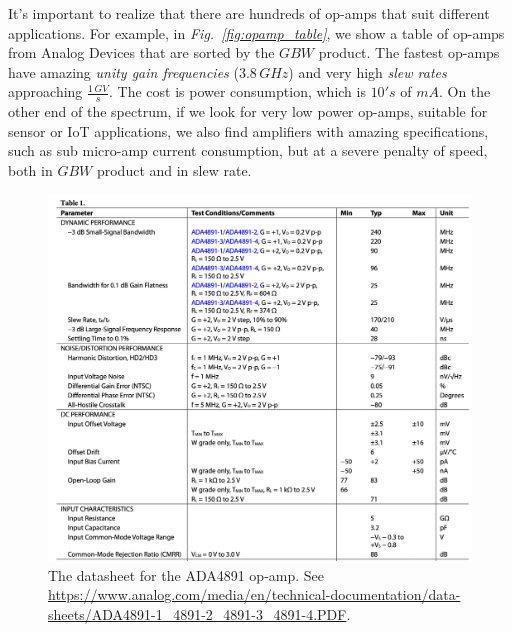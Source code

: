 It's important to realize that there are hundreds of op-amps that suit different applications.  For example, in \emph{Fig.~\ref{fig:opamp_table}}, we show a table of op-amps from Analog Devices that are sorted by the $GBW$ product.  The fastest op-amps have amazing \textit{unity gain frequencies} ($3.8\,GHz$) and very high \textit{slew rates} approaching $\frac{1\,GV}{s}$.  The cost is power consumption, which is $10's$ of $mA$.  On the other end of the spectrum, if we look for very low power op-amps, suitable for sensor or IoT applications, we also find amplifiers with amazing specifications, such as sub micro-amp current consumption, but at a severe penalty of speed, both in $GBW$ product and in slew rate.
\newpage
\begin{figure}[H]
\centering
\includegraphics[width=1\columnwidth]{ada4891_datasheet_table.png}
\caption{The datasheet for the ADA4891 op-amp.  See \url{https://www.analog.com/media/en/technical-documentation/data-sheets/ADA4891-1_4891-2_4891-3_4891-4.PDF}.}
\label{fig:adi_datasheet}
\end{figure}
\newpage
